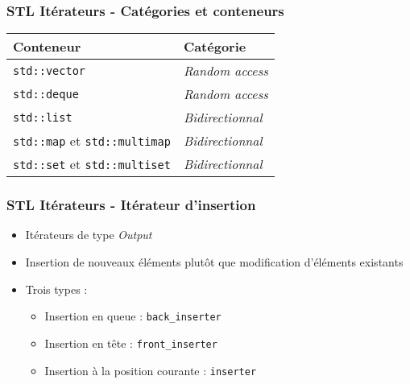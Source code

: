 \documentclass[C++.tex]{subfiles}
\begin{document}
\begin{frame}
	\frametitle{STL Itérateurs - Catégories et conteneurs}
	\begin{tabular}{ | p{5cm} | p{5cm} |}
		\hline
		Conteneur & Catégorie \\ 
		\hline
		\lstinline{std::vector} & \textit{Random access} \\ 
		\hline
		\lstinline{std::deque} & \textit{Random access} \\ 
		\hline
		\lstinline{std::list} & \textit{Bidirectionnal} \\ 
		\hline
		\lstinline{std::map} et \lstinline{std::multimap} & \textit{Bidirectionnal} \\ 
		\hline
		\lstinline{std::set} et \lstinline{std::multiset} & \textit{Bidirectionnal} \\ 
		\hline
	\end{tabular} 
\end{frame}

\begin{frame}
	\frametitle{STL Itérateurs - Itérateur d'insertion}
	\begin{itemize}
		\item Itérateurs de type \textit{Output}


		\item Insertion de nouveaux éléments plutôt que modification d'éléments existants


		\item Trois types :
		\begin{itemize}
			\item Insertion en queue : \lstinline|back_inserter|
			\item Insertion en tête : \lstinline|front_inserter|
			\item Insertion à la position courante : \lstinline|inserter|


		\end{itemize}
	\end{itemize}
\end{frame}
\end{document}
